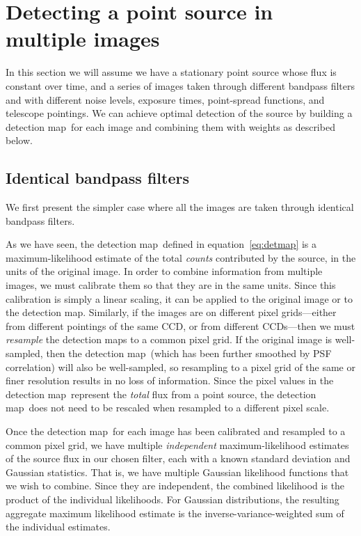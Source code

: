 \documentclass[letterpaper,preprint]{aastex62}
\newcommand{\equationname}{equation}
\newcommand{\eqnref}[1]{\mbox{\equationname~\ref{#1}}}
\newcommand{\detmap}{detection map}
\begin{document}
\section{Detecting a point source in multiple images}

In this section we will assume we have a stationary point source whose
flux is constant over time, and a series of images taken through
different bandpass filters and with different noise levels, exposure
times, point-spread functions, and telescope pointings.  We can
achieve optimal detection of the source by building a \detmap\ for
each image and combining them with weights as described below.



\subsection{Identical bandpass filters}

We first present the simpler case where all the images are taken
through identical bandpass filters.

As we have seen, the \detmap\ defined in \eqnref{eq:detmap} is a
maximum-likelihood estimate of the total \emph{counts} contributed by
the source, in the units of the original image.  In order to
combine information from multiple images, we must calibrate them so
that they are in the same units.  Since this calibration is simply a
linear scaling, it can be applied to the original image or to the
\detmap.  Similarly, if the images are on different pixel
grids---either from different pointings of the same CCD, or from
different CCDs---then we must \emph{resample} the \detmap s to a
common pixel grid.
%
If the original image is well-sampled, then the \detmap\ (which has
been further smoothed by PSF correlation) will also be well-sampled,
so resampling to a pixel grid of the same or finer resolution results
in no loss of information.
%
Since the pixel values in the \detmap\ represent the \emph{total} flux
from a point source, the \detmap\ does not need to be rescaled when
resampled to a different pixel scale.



Once the \detmap\ for each image has been calibrated and resampled to
a common pixel grid, we have multiple \emph{independent}
maximum-likelihood estimates of the source flux in our chosen filter,
each with a known standard deviation and Gaussian statistics.  That
is, we have multiple Gaussian likelihood functions that we wish to
combine.  Since they are independent, the combined likelihood is the
product of the individual likelihoods.  For Gaussian distributions,
the resulting aggregate maximum likelihood estimate is the
inverse-variance-weighted sum of the individual estimates.
\end{document}
